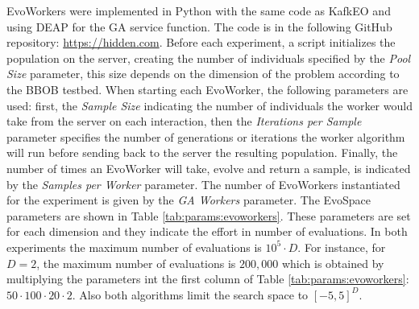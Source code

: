 \documentclass[sigconf]{acmart}
\begin{document}
EvoWorkers were implemented in Python with the same code as KafkEO and using
DEAP \cite{fortin2012deap} for the GA service function. The code is in the
following GitHub repository: \url{https://hidden.com}. Before each
experiment, a script initializes the population on the server, creating the
number of individuals specified by the {\em Pool Size} parameter, this
size depends on the dimension of the problem according to the BBOB testbed.
When starting each EvoWorker, the following parameters are used: first, the
{\em Sample Size} indicating the number of individuals the worker would take
from the server on each interaction, then the {\em Iterations per Sample}
parameter specifies the number of generations or iterations the worker algorithm
will run before sending back to the server the resulting population. Finally,
the number of times an  EvoWorker will take, evolve and return a sample, is
indicated by the {\em Samples per Worker} parameter.
 The number of EvoWorkers instantiated for the experiment 
 is given by the {\em GA Workers} parameter.  The EvoSpace parameters
are shown in Table \ref{tab:params:evoworkers}.
 These parameters are set for
each dimension and they indicate the effort in number of evaluations. In both
 experiments the maximum number of evaluations is $10^5 \cdot D$. For instance,
 for $D = 2$, the maximum number of evaluations is $200,000$ which is 
 obtained by multiplying
  the parameters int the first column of Table \ref{tab:params:evoworkers}: $50 \cdot 100 \cdot 20 \cdot 2$. Also both algorithms limit the search space to $[-5,5]^D$.
\end{document}

